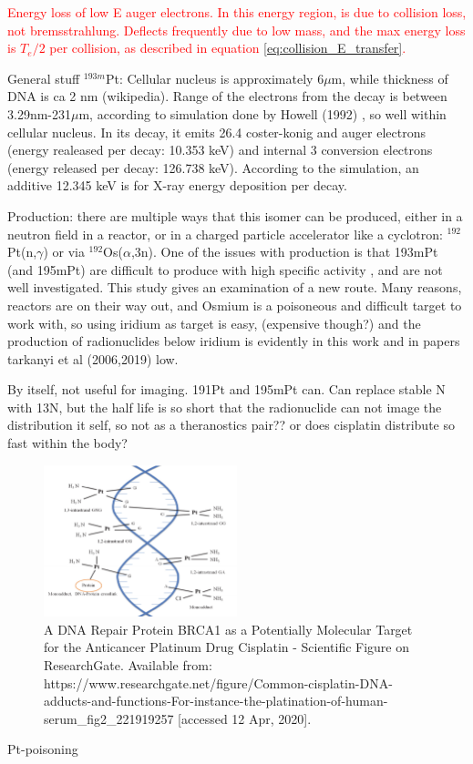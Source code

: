 \documentclass[a4paper,11pt,twoside]{book}
\begin{document}
\textcolor{red}{Energy loss of low E auger electrons. In this energy region, is due to collision loss, not bremsstrahlung. Deflects frequently due to low mass, and the max energy loss is $T_e/2$ per collision, as described in equation \ref{eq:collision_E_transfer}. }

\newline
General stuff $^{193m}$Pt: Cellular nucleus is approximately 6$\mu$m, while thickness of DNA is ca 2 nm (wikipedia). Range of the electrons from the decay is between 3.29nm-231$\mu$m, according to simulation done by Howell (1992) \cite{Howell1992}, so well within cellular nucleus. In its decay, it emits 26.4 coster-konig and auger electrons (energy realeased per decay: 10.353 keV) and internal 3 conversion electrons (energy released per decay: 126.738 keV). According to the simulation, an additive 12.345 keV is for X-ray energy deposition per decay. 

Production: there are multiple ways that this isomer can be produced, either in a neutron field in a reactor, or in a charged particle accelerator like a cyclotron: $^{192}$Pt(n,$\gamma$) or via $^{192}$Os($\alpha$,3n). One of the issues with production is that 193mPt (and 195mPt) are difficult to produce with high specific activity \cite{Qaim2017c}, and are not well investigated. This study gives an examination of a new route. Many reasons, reactors are on their way out, and Osmium is a poisoneous and difficult target to work with, so using iridium as target is easy, (expensive though?) and the production of radionuclides below iridium is evidently in this work and in papers tarkanyi et al (2006,2019) low. 

By itself, not useful for imaging. 191Pt and 195mPt can. Can replace stable N with 13N, but the half life is so short that the radionuclide can not image the distribution it self, so not as a theranostics pair?? or does cisplatin distribute so fast within the body? 



\begin{figure}
    \centering
    \includegraphics[width=0.5\textwidth]{Theory/cisplatin_DNA.png}
    \caption{A DNA Repair Protein BRCA1 as a Potentially Molecular Target for the Anticancer Platinum Drug Cisplatin - Scientific Figure on ResearchGate. Available from: https://www.researchgate.net/figure/Common-cisplatin-DNA-adducts-and-functions-For-instance-the-platination-of-human-serum_fig2_221919257 [accessed 12 Apr, 2020]. }
    \label{fig:cisplatin_DNA}
\end{figure}
Pt-poisoning 
\end{document}
